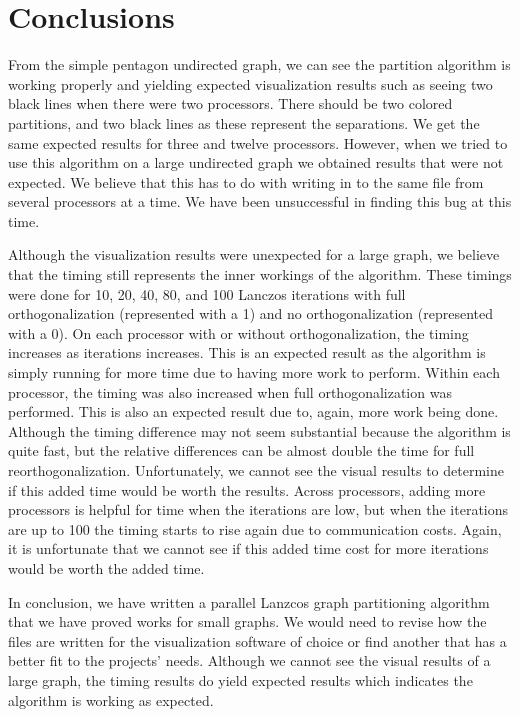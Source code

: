 \documentclass[11pt, oneside]{article}   	%
\begin{document}
\section{Conclusions}

From the simple pentagon undirected graph, we can see the partition algorithm is working properly and yielding expected visualization results such as seeing two black lines when there were two processors. There should be two colored partitions, and two black lines as these represent the separations. We get the same expected results for three and twelve processors. However, when we tried to use this algorithm on a large undirected graph we obtained results that were not expected. We believe that this has to do with writing in to the same file from several processors at a time. We have been unsuccessful in finding this bug at this time.

Although the visualization results were unexpected for a large graph, we believe that the timing still represents the inner workings of the algorithm. These timings were done for 10, 20, 40, 80, and 100 Lanczos iterations with full orthogonalization (represented with a 1) and no orthogonalization (represented with a 0). On each processor with or without orthogonalization, the timing increases as iterations increases. This is an expected result as the algorithm is simply running for more time due to having more work to perform. Within each processor, the timing was also increased when full orthogonalization was performed. This is also an expected result due to, again, more work being done. Although the timing difference may not seem substantial because the algorithm is quite fast, but the relative differences can be almost double the time for full reorthogonalization. Unfortunately, we cannot see the visual results to determine if this added time would be worth the results. Across processors, adding more processors is helpful for time when the iterations are low, but when the iterations are up to 100 the timing starts to rise again due to communication costs. Again, it is unfortunate that we cannot see if this added time cost for more iterations would be worth the added time.

In conclusion, we have written a parallel Lanzcos graph partitioning algorithm that we have proved works for small graphs. We would need to revise how the files are written for the visualization software of choice or find another that has a better fit to the projects' needs. Although we cannot see the visual results of a large graph, the timing results do yield expected results which indicates the algorithm is working as expected.
\end{document}
